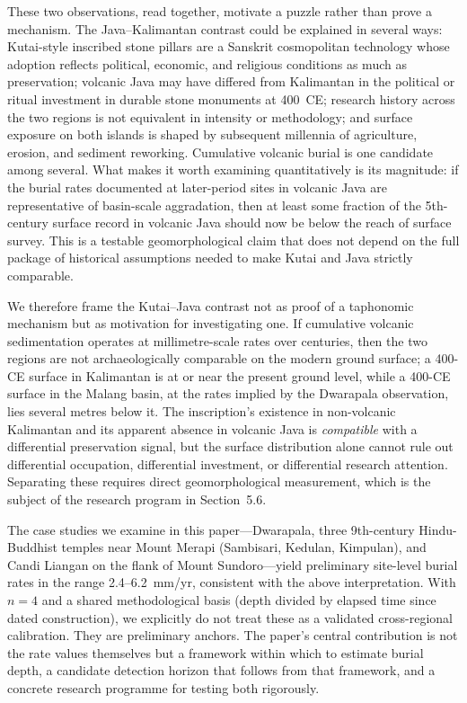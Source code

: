 \documentclass[12pt,a4paper]{article}
\begin{document}
These two observations, read together, motivate a puzzle rather than prove a mechanism. The Java--Kalimantan contrast could be explained in several ways: Kutai-style inscribed stone pillars are a Sanskrit cosmopolitan technology whose adoption reflects political, economic, and religious conditions as much as preservation; volcanic Java may have differed from Kalimantan in the political or ritual investment in durable stone monuments at 400~CE; research history across the two regions is not equivalent in intensity or methodology; and surface exposure on both islands is shaped by subsequent millennia of agriculture, erosion, and sediment reworking. Cumulative volcanic burial is one candidate among several. What makes it worth examining quantitatively is its magnitude: if the burial rates documented at later-period sites in volcanic Java are representative of basin-scale aggradation, then at least some fraction of the 5th-century surface record in volcanic Java should now be below the reach of surface survey. This is a testable geomorphological claim that does not depend on the full package of historical assumptions needed to make Kutai and Java strictly comparable.

We therefore frame the Kutai--Java contrast not as proof of a taphonomic mechanism but as motivation for investigating one. If cumulative volcanic sedimentation operates at millimetre-scale rates over centuries, then the two regions are not archaeologically comparable on the modern ground surface; a 400-CE surface in Kalimantan is at or near the present ground level, while a 400-CE surface in the Malang basin, at the rates implied by the Dwarapala observation, lies several metres below it. The inscription's existence in non-volcanic Kalimantan and its apparent absence in volcanic Java is \emph{compatible} with a differential preservation signal, but the surface distribution alone cannot rule out differential occupation, differential investment, or differential research attention. Separating these requires direct geomorphological measurement, which is the subject of the research program in Section~5.6.

The case studies we examine in this paper---Dwarapala, three 9th-century Hindu-Buddhist temples near Mount Merapi (Sambisari, Kedulan, Kimpulan), and Candi Liangan on the flank of Mount Sundoro---yield preliminary site-level burial rates in the range 2.4--6.2~mm/yr, consistent with the above interpretation. With $n=4$ and a shared methodological basis (depth divided by elapsed time since dated construction), we explicitly do not treat these as a validated cross-regional calibration. They are preliminary anchors. The paper's central contribution is not the rate values themselves but a framework within which to estimate burial depth, a candidate detection horizon that follows from that framework, and a concrete research programme for testing both rigorously.
\end{document}
